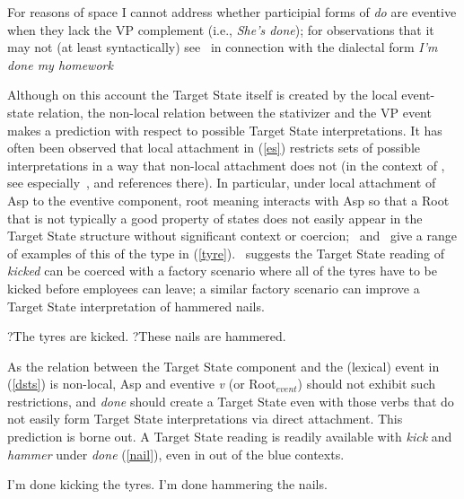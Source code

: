 \documentclass[output=paper,modfonts,nonflat]{langsci/langscibook}
\begin{document}
For reasons of space I cannot address whether participial forms of \emph{do}
are eventive when they lack the VP complement (i.e., \emph{She's done}); for
observations that it may not (at least syntactically) see~\cite{Fruehwald2015a}
in connection with the dialectal form \emph{I'm done my homework}

Although on this account the Target State itself is created by the local
event-state relation, the non-local relation between the stativizer and the VP
event makes a prediction with respect to possible Target State interpretations.
It has often been observed that  local attachment in (\ref{es}) restricts sets
of possible interpretations in a way that non-local attachment does not (in the
context of , see especially~\cite{Anagnostopoulou2013a}, and
references there). In particular, under local attachment of Asp to the eventive
component, root meaning interacts with Asp so that a Root that is not typically
a good property of states does not easily appear in the Target State structure
without significant context or coercion;~\cite{Kratzer2001a}
and~\cite{Embick2009a} give a range of examples of this of the type in
(\ref{tyre}).~\cite{Embick2004a} suggests the Target State reading of
\emph{kicked} can be coerced with a factory scenario where all of the tyres
have to be kicked before employees can leave; a similar factory scenario can
improve a Target State interpretation of hammered nails.


\begin{exe}
\ex\label{tyre}
\begin{xlist}
\ex ?The tyres are kicked.
\ex ?These nails are hammered.
\end{xlist}
\end{exe}

As the relation between the Target State component and the (lexical) event in
(\ref{dsts}) is non-local, Asp and eventive \emph{v} (or Root$_{event}$) should
not exhibit such restrictions, and \emph{done} should create a Target State
even with those verbs that do not easily form Target State interpretations via
direct attachment. This prediction is borne out. A Target State reading is
readily available with \emph{kick} and \emph{hammer} under \emph{done}
(\ref{nail}), even in out of the blue contexts.

\begin{exe}
\ex\label{nail}
\begin{xlist}
\ex I'm done kicking the tyres.
\ex I'm done hammering the nails.
\end{xlist}
\end{exe}
\end{document}
